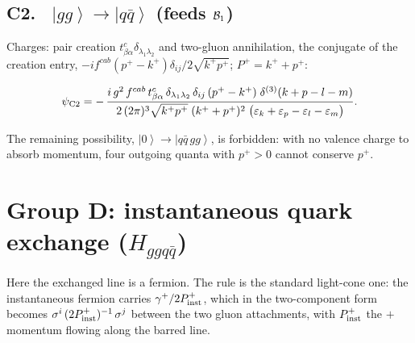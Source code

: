 \documentclass[11pt]{article}
\newcommand{\ibar}[2]{\draw[line width=1.1pt] (#1-0.13,#2) -- (#1+0.13,#2);}
\newcommand{\eps}{\varepsilon}
\newcommand{\dthree}{\delta^{(3)}}
\newcommand{\ket}[1]{\left|#1\right\rangle}
\newcommand{\vac}{\ket{0}}
\newcommand{\qk}[3]{q^{#1}_{#2}(#3)}
\newcommand{\aqk}[3]{\bar q^{#1}_{#2}(#3)}
\newcommand{\gl}[3]{g^{#1}_{#2}(#3)}
\begin{document}
\subsection*{C2. \ $\ket{gg}\to\ket{q\bar q}$ \quad (feeds $\mathcal{B}_{1}$)}
\begin{center}
\end{center}
Charges: pair creation $t^{c}_{\beta\alpha}\delta_{\lambda_{1}\lambda_{2}}$ and two-gluon
annihilation, the conjugate of the creation entry, $-if^{cab}(p^{+}-k^{+})\delta_{ij}/
2\sqrt{k^{+}p^{+}}$; $P^{+}=k^{+}+p^{+}$:
\begin{res}
\begin{equation}
\psi_{\rm C2}=-\,\frac{i\,g^{2}\,f^{cab}\,t^{c}_{\beta\alpha}\,
\delta_{\lambda_{1}\lambda_{2}}\,\delta_{ij}\,(p^{+}-k^{+})\;\dthree(k+p-l-m)}
{2\,(2\pi)^{3}\sqrt{k^{+}p^{+}}\;(k^{+}+p^{+})^{2}\;
\big(\eps_{k}+\eps_{p}-\eps_{l}-\eps_{m}\big)} .
\label{eq:C2}
\end{equation}
\end{res}
\noindent
The remaining possibility, $\vac\to\ket{q\bar q\,gg}$, is forbidden: with no valence charge to
absorb momentum, four outgoing quanta with $p^{+}>0$ cannot conserve $p^{+}$.

\section{Group D: instantaneous quark exchange ($H_{ggq\bar q}$)}

Here the exchanged line is a fermion. The rule is the standard light-cone one: the instantaneous
fermion carries $\gamma^{+}/2P^{+}_{\rm inst}$, which in the two-component form becomes
$\sigma^{i}\,(2P^{+}_{\rm inst})^{-1}\,\sigma^{j}$ between the two gluon attachments, with
$P^{+}_{\rm inst}$ the $+$ momentum flowing along the barred line.
\end{document}

